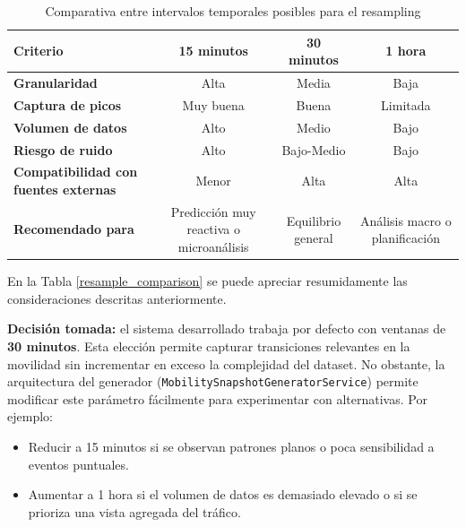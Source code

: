 \begin{table}[H]
	\centering
	\caption{Comparativa entre intervalos temporales posibles para el resampling}
	\label{tab:resample_comparison}
	\begin{tabular}{|l|c|c|c|}
		\hline
		\textbf{Criterio} & \textbf{15 minutos} & \textbf{30 minutos} & \textbf{1 hora} \\
		\hline
		\textbf{Granularidad}        & Alta        & Media       & Baja \\
		\textbf{Captura de picos}    & Muy buena   & Buena       & Limitada \\
		\textbf{Volumen de datos}    & Alto        & Medio       & Bajo \\
		\textbf{Riesgo de ruido}     & Alto        & Bajo-Medio  & Bajo \\
		\textbf{Compatibilidad con fuentes externas} & Menor       & Alta        & Alta \\
		\textbf{Recomendado para}    & Predicción muy reactiva o microanálisis & Equilibrio general & Análisis macro o planificación \\
		\hline
	\end{tabular}
\end{table}

En la Tabla \ref{resample_comparison} se puede apreciar resumidamente las consideraciones descritas anteriormente.

\vspace{1em}
\noindent \textbf{Decisión tomada:} el sistema desarrollado trabaja por defecto con ventanas de \textbf{30 minutos}. Esta elección permite capturar transiciones relevantes en la movilidad sin incrementar en exceso la complejidad del dataset. No obstante, la arquitectura del generador (\texttt{MobilitySnapshotGeneratorService}) permite modificar este parámetro fácilmente para experimentar con alternativas. Por ejemplo:

\begin{itemize}
	\item Reducir a 15 minutos si se observan patrones planos o poca sensibilidad a eventos puntuales.
	\item Aumentar a 1 hora si el volumen de datos es demasiado elevado o si se prioriza una vista agregada del tráfico.
\end{itemize}


